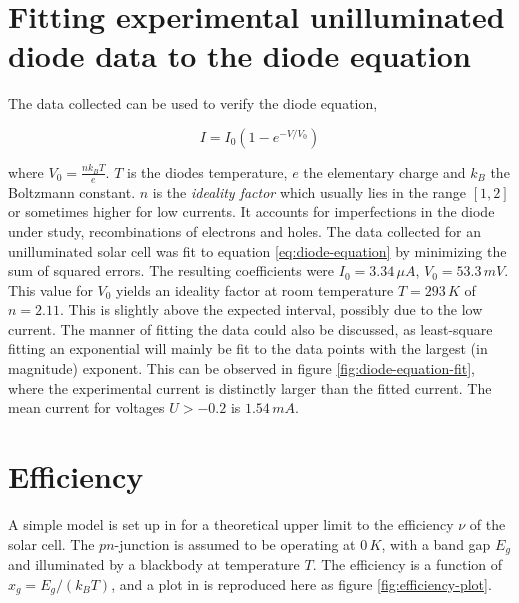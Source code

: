 \documentclass[a4paper,twoside=false,abstract=false,numbers=noenddot,
titlepage=false,headings=small,parskip=half,version=last]{scrartcl}
\begin{document}
\section{Fitting experimental unilluminated diode data to the diode equation}
The data collected can be used to verify the diode equation,

\begin{equation}
    I = I_0 \left(1-e^{-V/V_0}\right)\label{eq:diode-equation}
\end{equation}

where $V_0 = \frac{nk_BT}{e}$.
$T$ is the diodes temperature, $e$ the elementary charge and $k_B$ the Boltzmann constant.
$n$ is the \emph{ideality factor} which usually lies in the range $[1,2]$ or sometimes higher for low currents.
It accounts for imperfections in the diode under study, recombinations of electrons and holes.
The data collected for an unilluminated solar cell was fit to equation \eqref{eq:diode-equation} by minimizing the sum of squared errors.
The resulting coefficients were $I_0=3.34\,\mu A$, $V_0=53.3\,mV$.
This value for $V_0$ yields an ideality factor at room temperature $T=293\,K$ of $n=2.11$.
This is slightly above the expected interval, possibly due to the low current.
The manner of fitting the data could also be discussed, as least-square fitting an exponential will mainly be fit to the data points with the largest (in magnitude) exponent.
This can be observed in figure \ref{fig:diode-equation-fit}, where the experimental current is distinctly larger than the fitted current.
The mean current for voltages $U>-0.2$ is $1.54\,mA$.


\section{Efficiency}
A simple model is set up in \cite{lab-instruction} for a theoretical upper limit to the efficiency $\nu$ of the solar cell.
The $pn$-junction is assumed to be operating at $0\,K$, with a band gap $E_g$
and illuminated by a blackbody at temperature $T$.
The efficiency is a function of $x_g=E_g/(k_BT)$, and a plot in \cite{lab-instruction} is reproduced here as figure \ref{fig:efficiency-plot}.
\end{document}
